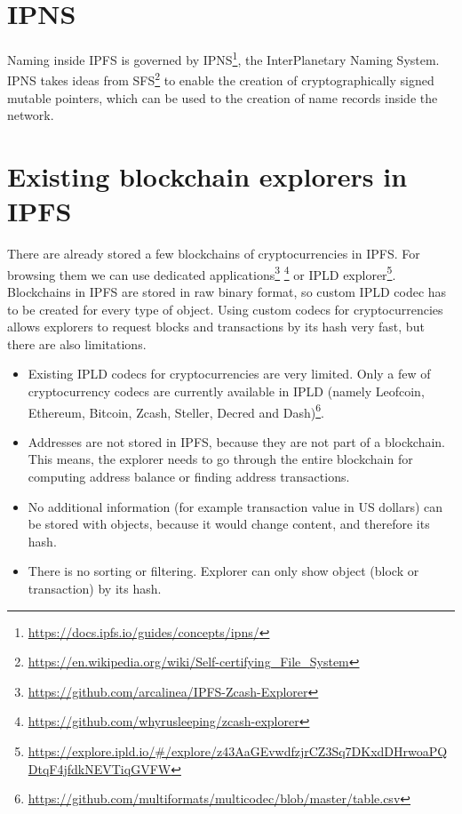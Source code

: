 \section{IPNS}
Naming inside IPFS is governed by IPNS\footnote{\url{https://docs.ipfs.io/guides/concepts/ipns/}}, the InterPlanetary Naming System. IPNS takes ideas from SFS\footnote{\url{https://en.wikipedia.org/wiki/Self-certifying_File_System}} to enable the creation of cryptographically signed mutable pointers, which can be used to the creation of name records inside the network.

\section{Existing blockchain explorers in IPFS}
There are already stored a few blockchains of cryptocurrencies in IPFS. For browsing them we can use dedicated applications\footnote{\url{https://github.com/arcalinea/IPFS-Zcash-Explorer}} \footnote{\url{https://github.com/whyrusleeping/zcash-explorer}} or IPLD explorer\footnote{\url{https://explore.ipld.io/\#/explore/z43AaGEvwdfzjrCZ3Sq7DKxdDHrwoaPQDtqF4jfdkNEVTiqGVFW}}. Blockchains in IPFS are stored in raw binary format, so custom IPLD codec has to be created for every type of object. Using custom codecs for cryptocurrencies allows explorers to request blocks and transactions by its hash very fast, but there are also limitations.

\begin{itemize}
    \item Existing IPLD codecs for cryptocurrencies are very limited. Only a few of cryptocurrency codecs are currently available in IPLD (namely Leofcoin, Ethereum, Bitcoin, Zcash, Steller, Decred and Dash)\footnote{\url{https://github.com/multiformats/multicodec/blob/master/table.csv}}.
    \item Addresses are not stored in IPFS, because they are not part of a blockchain. This means, the explorer needs to go through the entire blockchain for computing address balance or finding address transactions.
    \item No additional information (for example transaction value in US dollars) can be stored with objects, because it would change content, and therefore its hash.
    \item There is no sorting or filtering. Explorer can only show object (block or transaction) by its hash. 
\end{itemize}




